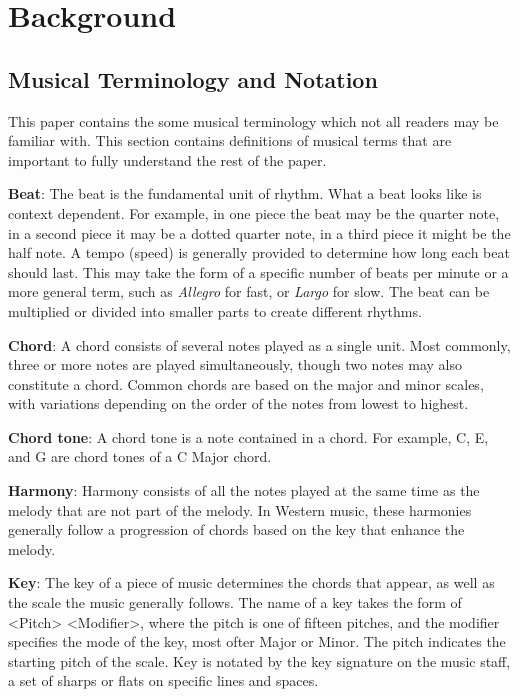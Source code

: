 \chapter{Background} \label{bg}


\section{Musical Terminology and Notation} \label{bg:musicTerminology}

This paper contains the some musical terminology which not all readers may be familiar with.
This section contains definitions of musical terms that are important to fully understand the rest of the paper.

\textbf{Beat}: The beat is the fundamental unit of rhythm.
What a beat looks like is context dependent.
For example, in one piece the beat may be the quarter note, in a second piece it may be a dotted quarter note, in a third piece it might be the half note.
A tempo (speed) is generally provided to determine how long each beat should last.
This may take the form of a specific number of beats per minute or a more general term, such as \textit{Allegro} for fast, or \textit{Largo} for slow.
The beat can be multiplied or divided into smaller parts to create different rhythms.

\textbf{Chord}: A chord consists of several notes played as a single unit.
Most commonly, three or more notes are played simultaneously, though two notes may also constitute a chord.
Common chords are based on the major and minor scales, with variations depending on the order of the notes from lowest to highest.

\textbf{Chord tone}: A chord tone is a note contained in a chord.
For example, C, E, and G are chord tones of a C Major chord.

\textbf{Harmony}: Harmony consists of all the notes played at the same time as the melody that are not part of the melody.
In Western music, these harmonies generally follow a progression of chords based on the key that enhance the melody.

\textbf{Key}: The key of a piece of music determines the chords that appear, as well as the scale the music generally follows.
The name of a key takes the form of <Pitch> <Modifier>, where the pitch is one of fifteen pitches, and the modifier specifies the mode of the key, most ofter Major or Minor.
The pitch indicates the starting pitch of the scale.
Key is notated by the key signature on the music staff, a set of sharps or flats on specific lines and spaces.

